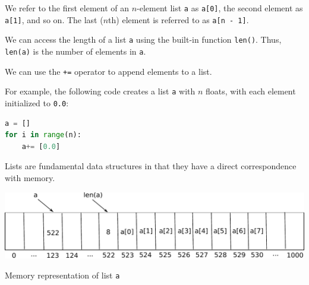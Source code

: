 \documentclass[8pt,a4paper,compress,handout]{beamer}
\begin{document}
\begin{frame}[fragile]
We refer to the first element of an $n$-element list \lstinline{a} as \lstinline{a[0]}, the second element as \lstinline{a[1]}, and so on. The last ($n$th) element is referred to as \lstinline{a[n - 1]}.

\bigskip

We can access the length of a list \lstinline{a} using the built-in function \lstinline{len()}. Thus, \lstinline{len(a)} is the number of elements in \lstinline{a}. 

\bigskip

We can use the \lstinline{+=} operator to append elements to a list. 

\bigskip

For example, the following code creates a list \lstinline{a} with $n$ floats, with each element initialized to \lstinline{0.0}:

\begin{lstlisting}[language=Python]
a = []
for i in range(n):
    a+= [0.0]
\end{lstlisting} 

\bigskip


Lists are fundamental data structures in that they have a direct correspondence with memory. 

\begin{center}
\includegraphics[scale=0.4]{figures/list_rep.pdf}

\smallskip

\tiny Memory representation of list \lstinline{a}
\end{center}
\end{frame}
\end{document}
